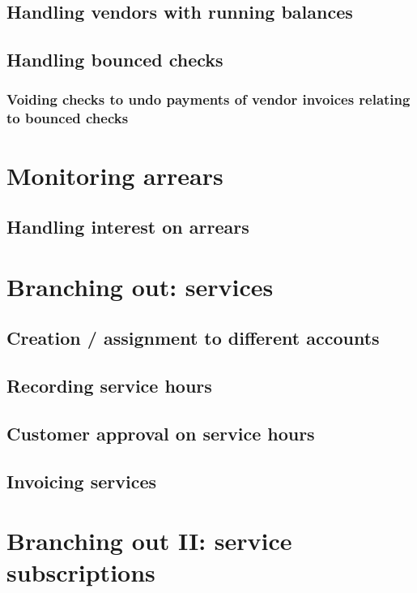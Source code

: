 \section{Handling vendors with running balances}
\label{sec-vendor-invoice-running-balance}

\section{Handling bounced checks}
\label{sec-vendor-invoice-bounced-checks}

\subsection{Voiding checks to undo payments of vendor invoices
 relating to bounced checks}



\chapter{Monitoring arrears}
\label{cha-starting-monitoring-arrears}

\section{Handling interest on arrears}
\label{sec-monitoring-interest-on-arrears}



\chapter{Branching out: services}
\label{cha-starting-branch-to-services}

\section{Creation / assignment to different accounts}
\label{sec-starting-services-assignment}

\section{Recording service hours}
\label{sec-starting-services-writing-hours}

\section{Customer approval on service hours}
\label{sec-starting-services-hours-customer-approval}

\section{Invoicing services}
\label{sec-starting-services-invoicing}

\chapter{Branching out II: service subscriptions}
\label{cha-starting-services-subscriptions}

